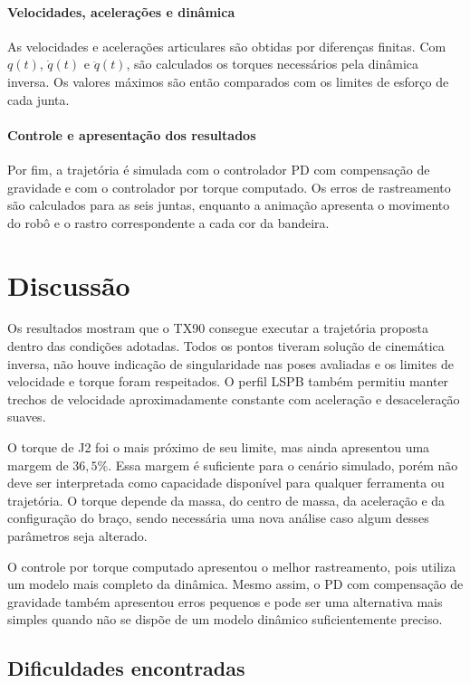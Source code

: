 \paragraph{Velocidades, acelerações e dinâmica}
As velocidades e acelerações articulares são obtidas por diferenças finitas. Com $q(t)$, $\dot q(t)$ e $\ddot q(t)$, são calculados os torques necessários pela dinâmica inversa. Os valores máximos são então comparados com os limites de esforço de cada junta.

\paragraph{Controle e apresentação dos resultados}
Por fim, a trajetória é simulada com o controlador PD com compensação de gravidade e com o controlador por torque computado. Os erros de rastreamento são calculados para as seis juntas, enquanto a animação apresenta o movimento do robô e o rastro correspondente a cada cor da bandeira.

\newpage
\section{Discussão}

Os resultados mostram que o TX90 consegue executar a trajetória proposta dentro das condições adotadas. Todos os pontos tiveram solução de cinemática inversa, não houve indicação de singularidade nas poses avaliadas e os limites de velocidade e torque foram respeitados. O perfil LSPB também permitiu manter trechos de velocidade aproximadamente constante com aceleração e desaceleração suaves.

O torque de J2 foi o mais próximo de seu limite, mas ainda apresentou uma margem de $36{,}5\%$. Essa margem é suficiente para o cenário simulado, porém não deve ser interpretada como capacidade disponível para qualquer ferramenta ou trajetória. O torque depende da massa, do centro de massa, da aceleração e da configuração do braço, sendo necessária uma nova análise caso algum desses parâmetros seja alterado.

O controle por torque computado apresentou o melhor rastreamento, pois utiliza um modelo mais completo da dinâmica. Mesmo assim, o PD com compensação de gravidade também apresentou erros pequenos e pode ser uma alternativa mais simples quando não se dispõe de um modelo dinâmico suficientemente preciso.

\subsection{Dificuldades encontradas}

